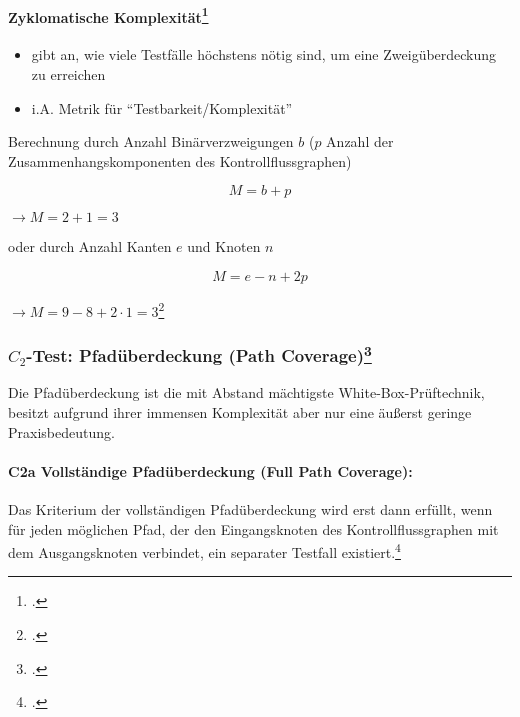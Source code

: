 \documentclass{lehramt-informatik-haupt}
\begin{document}
%

\paragraph{Zyklomatische Komplexität\footcite[Seite 38]{sosy:fs:5}}

\begin{itemize}
\item gibt an, wie viele Testfälle höchstens nötig sind, um eine
Zweigüberdeckung zu erreichen

\item i.A. Metrik für “Testbarkeit/Komplexität”
\end{itemize}

\noindent
Berechnung durch Anzahl Binärverzweigungen $b$ ($p$ Anzahl der
Zusammenhangskomponenten des Kontrollflussgraphen)

\begin{displaymath}
M = b + p
\end{displaymath}

$\rightarrow M = 2 + 1 = 3$

\noindent
oder durch Anzahl Kanten $e$ und Knoten $n$

\begin{displaymath}
M = e - n + 2p
\end{displaymath}

$\rightarrow M = 9 - 8 + 2 \cdot 1 = 3$\footcite[Kapitel 4.4.6
McCabe-Überdeckung, Seite 216-220]{hoffmann:software}

%

\subsubsection{$C_2$-Test: Pfadüberdeckung (Path Coverage)\footcite[Seite 39]{sosy:fs:5}}

Die Pfadüberdeckung ist die mit Abstand mächtigste
White-Box-Prüftechnik, besitzt aufgrund ihrer immensen Komplexität
aber nur eine äußerst geringe Praxisbedeutung.

%

\paragraph{C2a Vollständige Pfadüberdeckung (Full Path Coverage):}

Das Kriterium der vollständigen Pfadüberdeckung wird erst dann erfüllt,
wenn für jeden möglichen Pfad, der den Eingangsknoten des
Kontrollflussgraphen mit dem Ausgangsknoten verbindet, ein separater
Testfall existiert.\footcite[Seite 210]{hoffmann:software}
\end{document}
